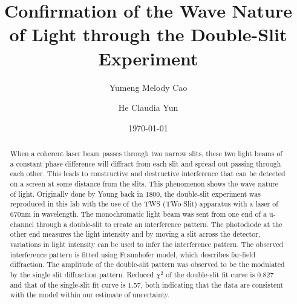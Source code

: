 \documentclass[prb,preprint]{revtex4-1}
\begin{document}
\title{Confirmation of the Wave Nature of Light through the Double-Slit Experiment}

\author{Yumeng Melody Cao}

\author{He Claudia Yun}


\date{\today}


\begin{abstract}

When a coherent laser beam passes through two narrow slits, these two light beams of a constant phase difference will diffract from each slit and spread out passing through each other. This leads to constructive and destructive interference that can be detected on a screen at some distance from the slits. This phenomenon shows the wave nature of light. 
Originally done by Young back in 1800, the double-slit experiment was reproduced in this lab with the use of the TWS (TWo-Slit) apparatus with a laser of 670nm in wavelength. The monochromatic light beam was sent from one end of a u-channel through a double-slit to create an interference pattern. The photodiode at the other end measures the light intensity and by moving a slit across the detector, variations in light intensity can be used to infer the interference pattern. 
The observed interference pattern is fitted using Fraunhofer model, which describes far-field diffraction. The amplitude of the double-slit pattern was observed to be the modulated by the single slit diffraction pattern. Reduced $\chi^2$ of the double-slit fit curve is 0.827 and that of the single-slit fit curve is 1.57, both indicating that the data are consistent with the model within our estimate of uncertainty.

\end{abstract}
\end{document}
